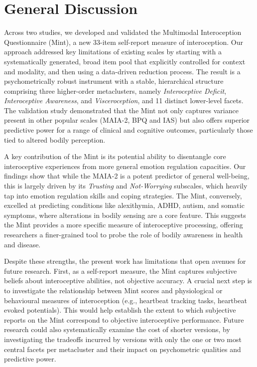 \documentclass[
  jou,
  floatsintext,
  longtable,
  nolmodern,
  notxfonts,
  notimes,
  colorlinks=true,linkcolor=blue,citecolor=blue,urlcolor=blue]{apa7}
\begin{document}
\section{General Discussion}\label{general-discussion}

Across two studies, we developed and validated the Multimodal
Interoception Questionnaire (Mint), a new 33-item self-report measure of
interoception. Our approach addressed key limitations of existing scales
by starting with a systematically generated, broad item pool that
explicitly controlled for context and modality, and then using a
data-driven reduction process. The result is a psychometrically robust
instrument with a stable, hierarchical structure comprising three
higher-order metaclusters, namely \emph{Interoceptive Deficit},
\emph{Interoceptive Awareness}, and \emph{Visceroception}, and 11
distinct lower-level facets. The validation study demonstrated that the
Mint not only captures variance present in other popular scales (MAIA-2,
BPQ and IAS) but also offers superior predictive power for a range of
clinical and cognitive outcomes, particularly those tied to altered
bodily perception.

A key contribution of the Mint is its potential ability to disentangle
core interoceptive experiences from more general emotion regulation
capacities. Our findings show that while the MAIA-2 is a potent
predictor of general well-being, this is largely driven by its
\emph{Trusting} and \emph{Not-Worrying} subscales, which heavily tap
into emotion regulation skills and coping strategies. The Mint,
conversely, excelled at predicting conditions like alexithymia, ADHD,
autism, and somatic symptoms, where alterations in bodily sensing are a
core feature. This suggests the Mint provides a more specific measure of
interoceptive processing, offering researchers a finer-grained tool to
probe the role of bodily awareness in health and disease.

Despite these strengths, the present work has limitations that open
avenues for future research. First, as a self-report measure, the Mint
captures subjective beliefs about interoceptive abilities, not objective
accuracy. A crucial next step is to investigate the relationship between
Mint scores and physiological or behavioural measures of interoception
(e.g., heartbeat tracking tasks, heartbeat evoked potentials). This
would help establish the extent to which subjective reports on the Mint
correspond to objective interoceptive performance. Future research could
also systematically examine the cost of shorter versions, by
investigating the tradeoffs incurred by versions with only the one or
two most central facets per metacluster and their impact on psychometric
qualities and predictive power.
\end{document}
